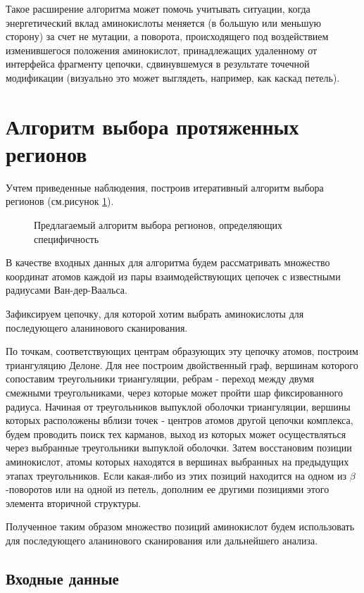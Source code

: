 Такое расширение алгоритма может помочь учитывать ситуации, когда энергетический вклад аминокислоты меняется (в большую или меньшую сторону) за счет не мутации, а поворота, происходящего под воздействием изменившегося положения аминокислот, принадлежащих удаленному от интерфейса фрагменту цепочки, сдвинувшемуся в результате точечной модификации (визуально это может выглядеть, например, как каскад петель). 



\section{Алгоритм выбора протяженных регионов}
Учтем приведенные наблюдения, построив итеративный алгоритм выбора регионов (см.рисунок \ref{fig:algo_scheme}).
\begin{figure}
\resizebox{\linewidth}{!}{
\algoscheme
}
\caption{\small{Предлагаемый алгоритм выбора регионов, определяющих специфичность }}
\label{fig:algo_scheme}
\end{figure}
В качестве входных данных для алгоритма будем рассматривать множество координат атомов каждой из пары взаимодействующих цепочек с известными радиусами Ван-дер-Ваальса.

Зафиксируем цепочку, для которой хотим выбрать аминокислоты для последующего аланинового сканирования. 

По точкам, соответствующих центрам образующих эту цепочку атомов, построим триангуляцию Делоне. Для нее построим двойственный граф, вершинам которого сопоставим треугольники триангуляции, ребрам - переход между двумя смежными треугольниками, через которые может пройти  шар фиксированного радиуса. Начиная от треугольников выпуклой оболочки триангуляции, вершины которых расположены вблизи точек - центров атомов другой цепочки комплекса, будем проводить поиск тех карманов, выход из которых может осуществляться через выбранные треугольники выпуклой оболочки. Затем  восстановим позиции аминокислот, атомы которых находятся в вершинах выбранных на предыдущих этапах треугольников. Если какая-либо из этих позиций находится на одном из $\beta$-поворотов или на одной из петель, дополним ее другими позициями этого элемента вторичной структуры.   

Полученное таким образом множество позиций аминокислот будем использовать для последующего аланинового сканирования или дальнейшего анализа.

\subsection{Входные данные}

